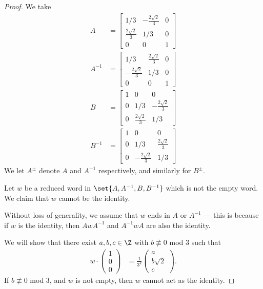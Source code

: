 \begin{proof}
  We take
  \begin{align*}
    A &= \begin{bmatrix}1/3 & -\frac{2\sqrt{2}}{3} & 0\\ \frac{2\sqrt{2}}{3} & 1/3 & 0 \\ 0 & 0 & 1\end{bmatrix}\\
    A^{-1} &= \begin{bmatrix}1/3 & \frac{2\sqrt{2}}{3} & 0\\ -\frac{2\sqrt{2}}{3} & 1/3 & 0 \\ 0 & 0 & 1\end{bmatrix}\\
    B &= \begin{bmatrix}1 & 0 & 0 \\ 0 & 1/3 & -\frac{2\sqrt{2}}{3} \\ 0 & \frac{2\sqrt{2}}{3} & 1/3\end{bmatrix}\\
    B^{-1} &= \begin{bmatrix}1 & 0 & 0 \\ 0 & 1/3 & \frac{2\sqrt{2}}{3} \\ 0 & -\frac{2\sqrt{2}}{3} & 1/3\end{bmatrix}
  \end{align*}
  We let $A^{\pm}$ denote $A$ and $A^{-1}$ respectively, and similarly for $B^{\pm}$.\newline

  Let $w$ be a reduced word in $\set{A,A^{-1},B,B^{-1}}$ which is not the empty word. We claim that $w$ cannot be the identity.\newline

  Without loss of generality, we assume that $w$ ends in $A$ or $A^{-1}$ --- this is because if $w$ is the identity, then $AwA^{-1}$ and $A^{-1}wA$ are also the identity.\newline

  We will show that there exist $a,b,c\in \Z$ with $b\nequiv 0$ mod $3$ such that
  \begin{align*}
    w \cdot \begin{pmatrix}1\\0\\0\end{pmatrix} &= \frac{1}{3^k} \begin{pmatrix}a\\b\sqrt{2}\\c\end{pmatrix}.
  \end{align*}
  If $b\nequiv 0$ mod $3$, and $w$ is not empty, then $w$ cannot act as the identity.\newline


\end{proof}
